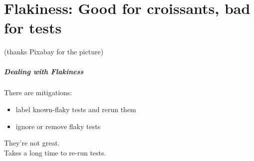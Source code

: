 \documentclass{beamer}
\newenvironment{changemargin}[1]{%
  \begin{list}{}{%
    \setlength{\topsep}{0pt}%
    \setlength{\leftmargin}{#1}%
    \setlength{\rightmargin}{1em}
    \setlength{\listparindent}{\parindent}%
    \setlength{\itemindent}{\parindent}%
    \setlength{\parsep}{\parskip}%
  }%
  \item[]}{\end{list}}
\begin{document}
\part{Flakiness: Good for croissants, bad for tests}
\begin{frame}
  \partpage
  \begin{center}
    (thanks Pixabay for the picture)
  \end{center}
\end{frame}

\begin{frame}[fragile]
  \frametitle{Dealing with Flakiness}
  \Large
  \begin{changemargin}{1cm}
    There are mitigations:
    \begin{itemize}
    \item label known-flaky tests and rerun them
    \item ignore or remove flaky tests
    \end{itemize}
    They're not great. \\
    Takes a long time to re-run tests.
  \end{changemargin}
\end{frame}
\end{document}
